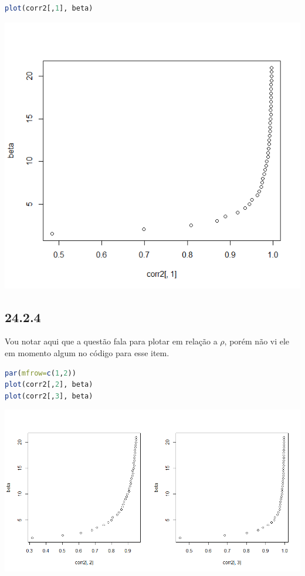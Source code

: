 \documentclass[12pt]{article}
\begin{document}
\begin{lstlisting}[language=R]
plot(corr2[,1], beta)
\end{lstlisting}

\begin{center}
\includegraphics*[scale=0.8]{3.png}
\end{center}

\subsection*{24.2.4}

Vou notar aqui que a questão fala para plotar em relação a $\rho$, porém não vi ele em momento algum no código para esse item.

\begin{lstlisting}[language=R]
par(mfrow=c(1,2))
plot(corr2[,2], beta)
plot(corr2[,3], beta)
\end{lstlisting}

\begin{center}
	\includegraphics*[scale=0.6]{4.png}
\end{center}
\end{document}
